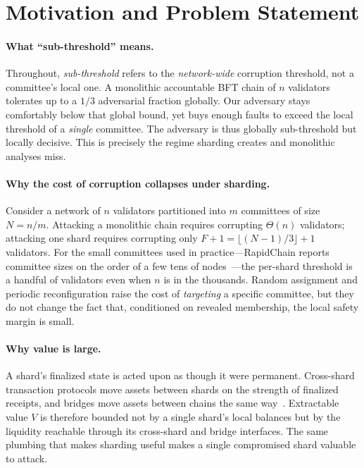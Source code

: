 \section{Motivation and Problem Statement}
\label{sec:motivation}

\paragraph{What ``sub-threshold'' means.}
Throughout, \emph{sub-threshold} refers to the \emph{network-wide} corruption threshold, not a
committee's local one. A monolithic accountable BFT chain of $n$ validators tolerates up to a
$1/3$ adversarial fraction globally. Our adversary stays comfortably below that global bound, yet
buys enough faults to exceed the local threshold of a \emph{single} committee. The adversary is
thus globally sub-threshold but locally decisive. This is precisely the regime sharding creates
and monolithic analyses miss.

\paragraph{Why the cost of corruption collapses under sharding.}
Consider a network of $n$ validators partitioned into $m$ committees of size $N=n/m$. Attacking a
monolithic chain requires corrupting $\Theta(n)$ validators; attacking one shard requires
corrupting only $F+1 = \lfloor (N-1)/3\rfloor + 1$ validators. For the small committees used in
practice---RapidChain reports committee sizes on the order of a few tens of
nodes~\cite{zamani2018rapidchain}---the per-shard threshold is a handful of validators even when
$n$ is in the thousands. Random assignment and periodic reconfiguration raise the cost of
\emph{targeting} a specific committee, but they do not change the fact that, conditioned on
revealed membership, the local safety margin is small.

\paragraph{Why value is large.}
A shard's finalized state is acted upon as though it were permanent. Cross-shard transaction
protocols move assets between shards on the strength of finalized receipts, and bridges move
assets between chains the same way~\cite{zamyatin2021sok,lee2022sokbridge}. Extractable value $V$
is therefore bounded not by a single shard's local balances but by the liquidity reachable through
its cross-shard and bridge interfaces. The same plumbing that makes sharding useful makes a
single compromised shard valuable to attack.

